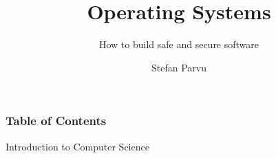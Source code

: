 \documentclass[aspectratio=1610]{beamer}
\title{\huge{Operating Systems}}
\subtitle{How to build safe and secure software}
\author{Stefan Parvu}
\begin{document}
\begin{frame}
\end{frame}


\begin{frame}
	\maketitle %
\end{frame}



\begin{frame}
\frametitle{Table of Contents}
\Large{Introduction to Computer Science}\\~\\
    \large
    \begin{columns}[onlytextwidth,T]
     
        \begin{column}{.55\textwidth}
            \vfill
            \tableofcontents[sections=1-3]
        \end{column}
        
        \begin{column}{.45\textwidth}
           
            \tableofcontents[sections=4-6]
        \end{column}
        
    \end{columns}
\end{frame}
\end{document}
